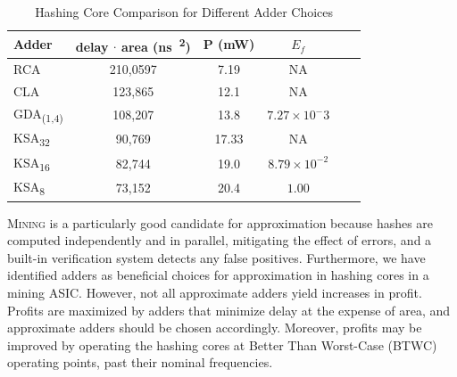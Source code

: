 \documentclass[portrait,a0,final]{a0poster}
\begin{document}
\begin{multicols}{3}
\begin{table}[H]
\centering
\caption{Hashing Core Comparison for Different Adder Choices}
\label{table:pipeline}
\begin{tabular}{l*{4}{c}r}
Adder & delay $\cdot$ area (\si{\nano\second \cdot {\micro\meter}^2}) & P (\si{\milli\watt}) & $E_f$ \\
\hline
RCA & 210,0597 & 7.19 & NA \\
CLA & 123,865 & 12.1 & NA \\
\rowcolor{gray}
GDA\textsubscript{(1,4)} & 108,207 & 13.8 & $7.27 \times 10^-3$ \\
KSA\textsubscript{32} & 90,769 & 17.33 &  NA \\
\rowcolor{gray}
KSA\textsubscript{16} & 82,744 & 19.0 & $8.79 \times 10^{-2}$ \\
\rowcolor{gray}
KSA\textsubscript{8} & 73,152 & 20.4 & $1.00$ \\
\end{tabular}
\end{table}

\begin{tcolorbox}[title=Conclusions]
\lettrine{M}{ining} is a particularly good candidate for approximation because hashes are computed independently and in parallel, mitigating the effect of errors, and a built-in verification system detects any false positives. Furthermore, we have identified adders as beneficial choices for approximation in hashing cores in a mining ASIC. However, not all approximate adders yield increases in profit. Profits are maximized by adders that minimize delay at the expense of area, and approximate adders should be chosen accordingly. Moreover, profits may be improved by operating the hashing cores at Better Than Worst-Case (BTWC) operating points, past their nominal frequencies.
\end{tcolorbox}

\end{multicols}

\end{document}
